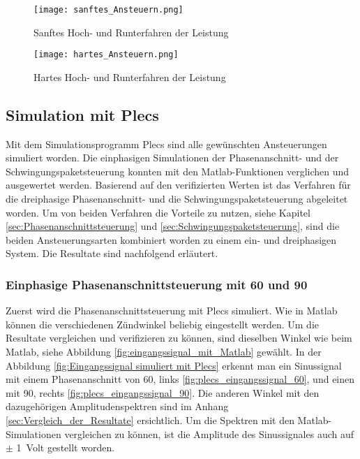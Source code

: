 \begin{figure}[ht!]
	\centering
	\texttt{[image: sanftes\_Ansteuern.png]}	
	\caption{Sanftes Hoch- und Runterfahren der Leistung}
	\label{fig:sanftes_Ansteuern}
\end{figure}
\newpage
\begin{figure}[ht!]
	\centering
	\texttt{[image: hartes\_Ansteuern.png]}	
	\caption{Hartes Hoch- und Runterfahren der Leistung}
	\label{fig:hartes_Ansteuern}
\end{figure}



\newpage
\subsection{Simulation mit Plecs}

Mit dem Simulationsprogramm Plecs sind alle gewünschten Ansteuerungen simuliert worden. Die einphasigen Simulationen der Phasenanschnitt- und der Schwingungspaketsteuerung konnten mit den Matlab-Funktionen verglichen und ausgewertet werden. Basierend auf den verifizierten Werten ist das Verfahren für die dreiphasige Phasenanschnitt- und die Schwingungspaketsteuerung abgeleitet worden. Um von beiden Verfahren die Vorteile zu nutzen, siehe Kapitel \ref{sec:Phasenanschnittsteuerung} und \ref{sec:Schwingungspaketsteuerung}, sind die beiden Ansteuerungsarten kombiniert worden zu einem ein- und dreiphasigen System. Die Resultate sind nachfolgend erläutert.  

\subsubsection{Einphasige Phasenanschnittsteuerung mit 60\textdegree \hspace{0.02cm} und 90\textdegree}

Zuerst wird die Phasenanschnittsteuerung mit Plecs simuliert. Wie in Matlab können die verschiedenen Zündwinkel beliebig eingestellt werden. Um die Resultate vergleichen und verifizieren zu können, sind dieselben Winkel wie beim Matlab, siehe Abbildung \ref{fig:eingangssignal_mit_Matlab} gewählt. In der Abbildung \ref{fig:Eingangssignal simuliert mit Plecs} erkennt man ein Sinussignal mit einem Phasenanschnitt von 60\textdegree \hspace{0.02cm}, links \ref{fig:plecs_eingangssignal_60}, und einen mit 90\textdegree \hspace{0.02cm}, rechts \ref{fig:plecs_eingangssignal_90}. Die anderen Winkel mit den dazugehörigen Amplitudenspektren sind im Anhang \ref{sec:Vergleich_der_Resultate} ersichtlich.
Um die Spektren mit den Matlab-Simulationen vergleichen zu können, ist die Amplitude des Sinussignales auch auf $\pm$ \SI{1}{Volt} gestellt worden.  

